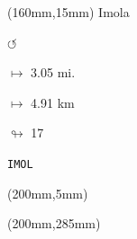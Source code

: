 \begin{textblock*}{40mm}(160mm,15mm)%
Imola
\par \Huge$\circlearrowleft$
\Large
\par$\mapsto$ 3.05 mi.
\par$\mapsto$ 4.91 km
\par$\looparrowright$ 17
\par\hfill\tiny\tt IMOL\\
\end{textblock*}
\begin{textblock*}{20mm}(200mm,5mm)%
\fbox{\thepage}
\end{textblock*}
\begin{textblock*}{20mm}(200mm,285mm)%
\fbox{\thepage}
\end{textblock*}
\null\newpage


